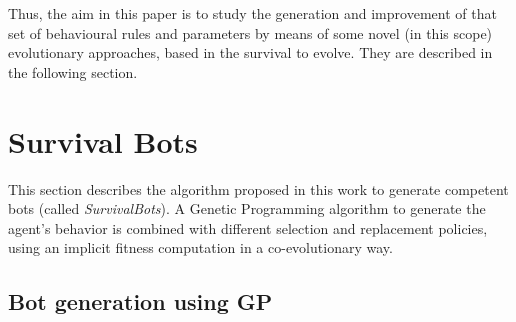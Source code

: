 \documentclass[conference]{IEEEtran}
\begin{document}

Thus, the aim in this paper is to study the generation and improvement of that set of behavioural rules and parameters by means of some novel (in this scope) evolutionary approaches, based in the survival to evolve. They are described in the following section.


%
\section{Survival Bots}
\label{sec:survival_bots}







%

This section describes the algorithm proposed in this work to generate competent bots (called {\em SurvivalBots}). A Genetic Programming \cite{GP_Koza92} algorithm to generate the agent's behavior is combined with different selection and replacement policies, using an implicit fitness computation in a co-evolutionary way.


\subsection{Bot generation using GP}
\label{subsec:generationgp}
\end{document}
